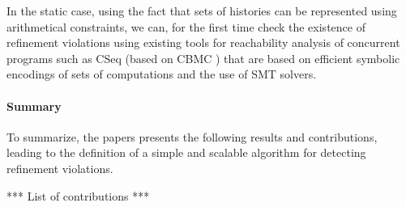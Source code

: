 In the static case, using the fact that sets of histories can be represented
using arithmetical constraints, we can, for the first time check the existence
of refinement violations using existing tools for reachability analysis of
concurrent programs such as CSeq \cite{} (based on CBMC \cite{}) that are based
on efficient symbolic encodings of sets of computations and the use of SMT
solvers.

\paragraph{Summary}

To summarize, the papers presents the following results and contributions,
leading to the definition of a simple and scalable algorithm for detecting
refinement violations.

*** List of contributions ***
